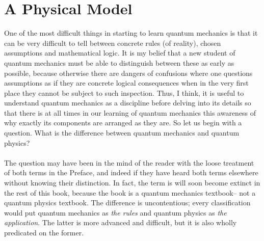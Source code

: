 \section{A Physical Model}
One of the most difficult things in starting to learn quantum mechanics is that it can be very difficult to tell between concrete rules (of reality), chosen assumptions and mathematical logic. It is my belief that a new student of quantum mechanics must be able to distinguish between these as early as possible, because otherwise there are dangers of confusions where one questions assumptions as if they are concrete logical consequences when in the very first place they cannot be subject to such inspection. Thus, I think, it is useful to understand quantum mechanics as a discipline before delving into its details so that there is at all times in our learning of quantum mechanics this awareness of why exactly its components are arranged as they are. So let us begin with a question. What is the difference between quantum mechanics and quantum physics?
\\\\
The question may have been in the mind of the reader with the loose treatment of both terms in the Preface, and indeed if they have heard both terms elsewhere without knowing their distinction. In fact, the term  is will soon become extinct in the rest of this book, because the book is a quantum mechanics textbook-- not a quantum physics textbook. The difference is uncontentious; every classification would put quantum mechanics as \textit{the rules} and quantum physics as \textit{the application}. The latter is more advanced and difficult, but it is also wholly predicated on the former. 
\\\\
